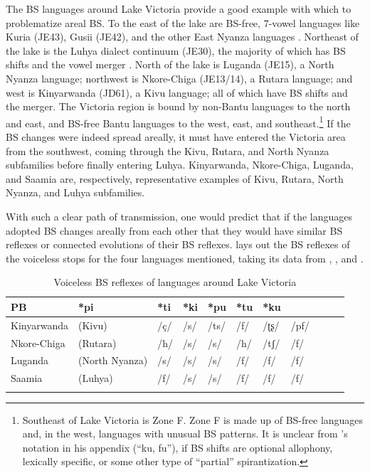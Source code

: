 \documentclass[output=paper,colorlinks,citecolor=brown
]{langscibook}
\begin{document}
The BS languages around Lake Victoria provide a good example with which to problematize areal BS. To the east of the lake are BS-free, 7-vowel languages like Kuria (JE43), Gusii (JE42), and the other East Nyanza languages \citep{mould1981}. Northeast of the lake is the Luhya dialect continuum (JE30), the majority of which has BS shifts and the vowel merger \citep{mould1981}. North of the lake is Luganda (JE15), a North Nyanza language; northwest is Nkore-Chiga (JE13/14), a Rutara language; and west is Kinyarwanda (JD61), a Kivu language; all of which have BS shifts and the merger. The Victoria region is bound by non-Bantu languages to the north and east, and BS-free Bantu languages to the west, east, and southeast.\footnote{Southeast of Lake Victoria is Zone F. Zone F is made up of BS-free languages and, in the west, languages with unusual BS patterns. It is unclear from \citeauthor{Janson2007}'s notation in his appendix (“ku, fu”), if BS shifts are optional allophony, lexically specific, or some other type of “partial” spirantization.} If the BS changes were indeed spread areally, it must have entered the Victoria area from the southwest, coming through the Kivu, Rutara, and North Nyanza subfamilies before finally entering Luhya. Kinyarwanda, Nkore-Chiga, Luganda, and Saamia are, respectively, representative examples of Kivu, Rutara, North Nyanza, and Luhya subfamilies.

With such a clear path of transmission, one would predict that if the languages adopted BS changes areally from each other that they would have similar BS reflexes or connected evolutions of their BS reflexes.    lays out the BS reflexes of the voiceless stops for the four languages mentioned, taking its data from \citet{kieffer2021}, \citet{poletto1998}, and \citet{mould1981}.


\begin{table}
\caption{Voiceless BS reflexes of languages around Lake Victoria
\citep{kieffer2021,mould1981,poletto1998}
}
\label{tab:kieffer:nyanza}
 \begin{tabular}{lllllllllll}
  \lsptoprule
           PB & *pi & *ti & *ki & *pu & *tu & *ku\\
  \midrule
Kinyarwanda & (Kivu) &/ç/ & /s/ & /ts/ & /f/ & /ʈʂ/ & /pf/\\
Nkore-Chiga &   (Rutara) &/h/ & /s/ & /s/ & /h/ & /tʃ/ & /f/\\
Luganda &  (North Nyanza) &/s/ & /s/ & /s/ & /f/ & /f/ & /f/\\
Saamia &(Luhya) &  /f/ & /s/ & /s/ & /f/ & /f/ & /f/\\
  \lspbottomrule
 \end{tabular}
\end{table}
\end{document}
